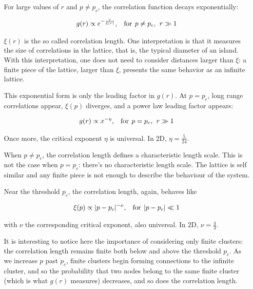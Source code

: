 For large values of $r$ and $p \neq p_c$, the correlation function decays exponentially: 

$$ 
    g(r) \propto e^{-\frac{r}{\xi(r)}} \textrm{,} \hspace{0.35cm}  \textrm{for} \hspace{0.15cm} p \neq p_c, \hspace{0.15cm} r \gg 1 
$$ 

$\xi(r)$ is the so called correlation length. One interpretation is that it measures the size of correlations in the lattice, that is, the typical diameter of an island. With this interpretation, one does not need to consider distances larger than $\xi$: a finite piece of the lattice, larger than $\xi$, presents the same behavior as an infinite lattice. 

This exponential form is only the leading factor in $g(r)$. At $p = p_c$, long range correlations appear, $\xi(p)$ diverges, and a power law leading factor appears:

$$ 
    g(r) \propto x^{-\eta} \textrm{,} \hspace{0.35cm}  \textrm{for} \hspace{0.15cm} p = p_c, \hspace{0.15cm} r \gg 1 
$$ 


Once more, the critical exponent $\eta$ is universal. In 2D, $\eta = \frac{5}{24}$. 

When $p \neq p_c$, the correlation length defines a characteristic length scale. This is not the case when $p = p_c$: there's no characteristic length scale. The lattice is self similar and any finite piece is not enough to describe the behaviour of the system.

Near the threshold $p_c$, the correlation length, again, behaves like 

$$ 
    \xi(p) \propto  |p - p_c|^{-\nu} \textrm{,} \hspace{0.35cm}  \textrm{for} \hspace{0.15cm} |p - p_c| \ll 1 
$$ 

with $\nu$ the corresponding critical exponent, also universal. In 2D, $\nu = \frac{4}{3}$.

It is interesting to notice here the importance of considering only finite clusters: the correlation length remains finite both below and above the threshold $p_c$. As we increase $p$ past $p_c$, finite clusters begin forming connections to the infinite cluster, and so the probability that two nodes belong to the same finite cluster (which is what $g(r)$ measures) decreases, and so does the correlation length.  

